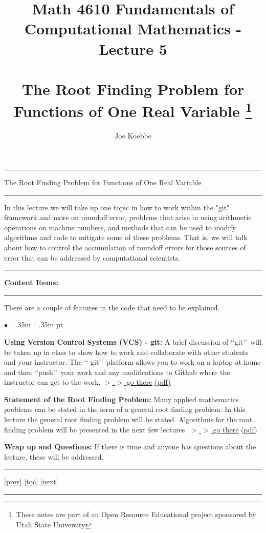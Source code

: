 \documentclass[10pt,fleqn]{article}
\title{ Math 4610 Fundamentals of Computational Mathematics  - Lecture 5 \\
            \ \\
  The Root Finding Problem for Functions of One Real Variable 
  \footnote{These notes are part of an Open Resource Educational project
            sponsored by Utah State University}}
\author{Joe Koebbe}
\begin{document}
\maketitle
\newpage
\vskip0.1in\hrule\vskip0.1in
\noindent
The Root Finding Problem for Functions of One Real Variable 
\vskip0.1in\hrule\vskip0.1in
In this lecture we will take up one topic in how to work within the "git"
framework and more on roundoff error, problems that arise in using arithmetic
operations on machine numbers, and methods that can be used to modify algorithms
and code to mitigate some of these problems. That is, we will talk about how to
control the accumulation of roundoff errors for those sources of error that can
be addressed by computational scientists.
\vskip0.1in\hrule\vskip0.1in
\noindent
{\bf Content Items:}
\vskip0.1in\hrule\vskip0.1in
\noindent
There are a couple of features in the code that need to be explained.
\begin{list}{$\bullet$}{ \parsep=0pt \listparindent=0pt
\topsep=0pt \rightmargin=.35in \leftmargin=.35in  pt
\itemsep=2pt}
  \item {\bf Using Version Control Systems (VCS) - git:} A brief discussion of
        \lq\lq git\rq\rq\ will be taken up in class to show how to work and
        collaborate with other students and your instructor. The \lq\lq
        git\rq\rq\ platform allows you to work on a laptop at home and then
        \lq\lq push\rq\rq\ your work and any modifications to Github where the
        instructor can get to the work.
     \href{https://jvkoebbe.github.io/math4610/lectures/lecture_05/md/git_primer}{$>$ $>$ go there}
     \href{https://jvkoebbe.github.io/math4610/lectures/lecture_05/pdf/git_primer.pdf}{(pdf)}
  \item {\bf Statement of the Root Finding Problem:} Many applied mathematics
     problems can be stated in the form of a general root finding problem. In
     this lecture the general root finding problem will be stated. Algorithms
     for the root finding problem will be presented in the next few lectures.
     \href{https://jvkoebbe.github.io/math4610/lectures/lecture_05/html/root_finding_problem.html}{$>$ $>$ go there}
     \href{https://jvkoebbe.github.io/math4610/lectures/lecture_05/pdf/root_finding_problem.pdf}{(pdf)}
  \item {\bf Wrap up and Questions:}  If there is time and anyone has questions
        about the lecture, these will be addressed.
\end{list}
\vskip0.1in\hrule\vskip0.1in
\noindent
\href{https://jvkoebbe.github.io/math4610/lectures/lecture_04/md/lecture_04}{[prev]}
\href{https://jvkoebbe.github.io/math4610/lectures/toc_lectures}{[toc]}
\href{https://jvkoebbe.github.io/math4610/lectures/lecture_06/md/lecture_06}{[next]}
\vskip0.1in\hrule\vskip0.1in
\end{document}
